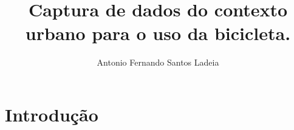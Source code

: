 \documentclass[final,12pt, times, 5p, twocolumn]{elsarticle}
\begin{document}
\begin{frontmatter}



\title{Captura de dados do contexto urbano para o uso da bicicleta.}


\author{Antonio Fernando Santos Ladeia}

\address{Instituto Federal de Educação, Ciência e Tecnologia da Bahia
\\ Rua Emidio dos Santos, s/n, Barbalho -  Bahia.
\\ ladeia@ifba.edu.br}

\begin{abstract}

\end{abstract}

\begin{keyword}


\end{keyword}

\end{frontmatter}


\section{Introdução}
\end{document}

